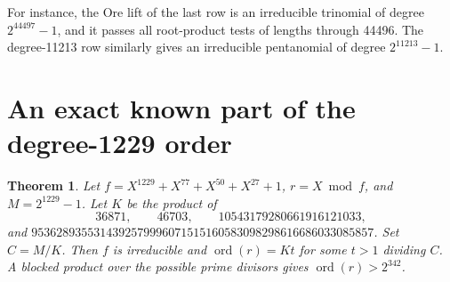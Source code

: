 \documentclass[11pt]{article}
\newtheorem{theorem}{Theorem}
\newcommand{\ord}{\operatorname{ord}}
\begin{document}
For instance, the Ore lift of the last row is an irreducible trinomial
of degree \(2^{44497}-1\), and it passes all root-product tests of
lengths through 44496. The degree-11213 row similarly gives an
irreducible pentanomial of degree \(2^{11213}-1\).

\section{An exact known part of the degree-1229 order}\label{sec:1229}
\begin{theorem}
Let \(f=X^{1229}+X^{77}+X^{50}+X^{27}+1\), \(r=X\bmod f\), and
\(M=2^{1229}-1\). Let \(K\) be the product of
\[
  36871,\qquad 46703,\qquad 10543179280661916121033,
\]
and \(9536289355314392579996071515160583098298616686033085857\).
Set \(C=M/K\). Then \(f\) is irreducible and
\(\ord(r)=Kt\) for some \(t>1\) dividing \(C\).
A blocked product over the possible prime divisors gives \(\ord(r)>2^{342}\).
\end{theorem}
\end{document}
